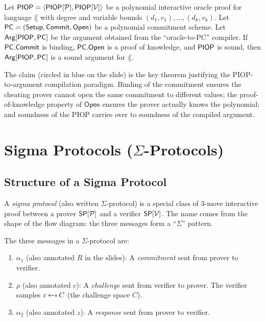 \documentclass[11pt]{article}
\begin{document}
\begin{claim}
Let $\mathsf{PIOP} = \langle \mathsf{PIOP}[\mathcal{P}], \mathsf{PIOP}[\mathcal{V}] \rangle$ be a polynomial interactive oracle proof for language $\lang$ with degree and variable bounds $(d_1, v_1), \ldots, (d_k, v_k)$. Let $\mathsf{PC} = (\mathsf{Setup}, \mathsf{Commit}, \mathsf{Open})$ be a polynomial commitment scheme. Let $\mathsf{Arg}[\mathsf{PIOP}, \mathsf{PC}]$ be the argument obtained from the ``oracle-to-PC'' compiler. If $\mathsf{PC}.\mathsf{Commit}$ is binding, $\mathsf{PC}.\mathsf{Open}$ is a proof of knowledge, and $\mathsf{PIOP}$ is sound, then $\mathsf{Arg}[\mathsf{PIOP}, \mathsf{PC}]$ is a sound argument for $\lang$.
\end{claim}

\begin{remark}
The claim (circled in blue on the slide) is the key theorem justifying the PIOP-to-argument compilation paradigm. Binding of the commitment ensures the cheating prover cannot open the same commitment to different values; the proof-of-knowledge property of $\mathsf{Open}$ ensures the prover actually knows the polynomial; and soundness of the PIOP carries over to soundness of the compiled argument.
\end{remark}

\section{Sigma Protocols ($\Sigma$-Protocols)}

\subsection{Structure of a Sigma Protocol}

A \emph{sigma protocol} (also written $\Sigma$-protocol) is a special class of 3-move interactive proof between a prover $\mathsf{SP}[\mathcal{P}]$ and a verifier $\mathsf{SP}[\mathcal{V}]$. The name comes from the shape of the flow diagram: the three messages form a ``$\Sigma$'' pattern.

\medskip

The three messages in a $\Sigma$-protocol are:
\begin{enumerate}
  \item $\alpha_1$ (also annotated $R$ in the slides): A \emph{commitment} sent from prover to verifier.
  \item $\rho$ (also annotated $c$): A \emph{challenge} sent from verifier to prover. The verifier samples $c \getsr C$ (the challenge space $C$).
  \item $\alpha_2$ (also annotated $z$): A \emph{response} sent from prover to verifier.
\end{enumerate}
\end{document}
